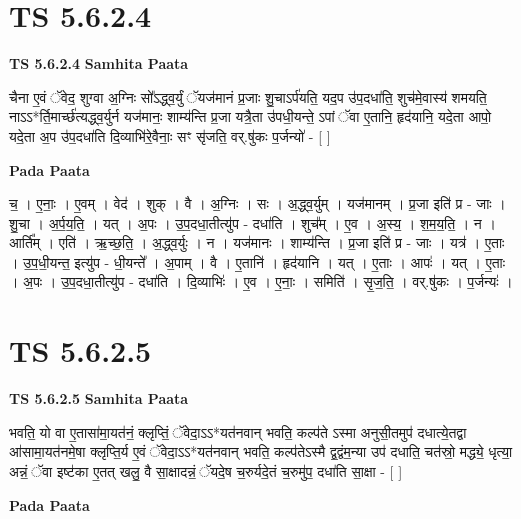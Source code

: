 \documentclass[17pt]{extarticle}
\begin{document}
\section*{ TS 5.6.2.4 }

\textbf{TS 5.6.2.4 } \newline
\textbf{Samhita Paata} \newline

चैना ए॒वं ॅवेद॒ शुग्वा अ॒ग्निः सो᳚ऽद्ध्व॒र्युं ॅयज॑मानं प्र॒जाः शु॒चाऽर्प॑यति॒ यद॒प उ॑प॒दधा॑ति॒ शुच॑मे॒वास्य॑ शमयति॒ नाऽऽ*र्ति॒मार्च्छ॑त्यद्ध्व॒र्युर्न यज॑मानः॒ शाम्य॑न्ति प्र॒जा यत्रै॒ता उ॑पधी॒यन्ते॒ ऽपां ॅवा ए॒तानि॒ हृद॑यानि॒ यदे॒ता आपो॒ यदे॒ता अ॒प उ॑प॒दधा॑ति दि॒व्याभि॑रे॒वैनाः॒ सꣳ सृ॑जति॒ वर्.षु॑कः प॒र्जन्यो॑ - [  ] \newline

\textbf{Pada Paata} \newline

च॒ । ए॒नाः॒ । ए॒वम् । वेद॑ । शुक् । वै । अ॒ग्निः । सः । अ॒द्ध्व॒र्युम् । यज॑मानम् । प्र॒जा इति॑ प्र - जाः । शु॒चा । अ॒र्प॒य॒ति॒ । यत् । अ॒पः । उ॒प॒दधा॒तीत्यु॑प - दधा॑ति । शुच᳚म् । ए॒व । अ॒स्य॒ । श॒म॒य॒ति॒ । न । आर्ति᳚म् । एति॑ । ऋ॒च्छ॒ति॒ । अ॒द्ध्व॒र्युः । न । यज॑मानः । शाम्य॑न्ति । प्र॒जा इति॑ प्र - जाः । यत्र॑ । ए॒ताः । उ॒प॒धी॒यन्त॒ इत्यु॑प - धी॒यन्ते᳚ । अ॒पाम् । वै । ए॒तानि॑ । हृद॑यानि । यत् । ए॒ताः । आपः॑ । यत् । ए॒ताः । अ॒पः । उ॒प॒दधा॒तीत्यु॑प - दधा॑ति । दि॒व्याभिः॑ । ए॒व । ए॒नाः॒ । समिति॑ । सृ॒ज॒ति॒ । वर्.षु॑कः । प॒र्जन्यः॑ ।  \newline




\section*{ TS 5.6.2.5 }

\textbf{TS 5.6.2.5 } \newline
\textbf{Samhita Paata} \newline

भवति॒ यो वा ए॒तासा॑मा॒यत॑नं॒ क्लृप्तिं॒ ॅवेदा॒ऽऽ*यत॑नवान् भवति॒ कल्प॑ते ऽस्मा अनुसी॒तमुप॑ दधात्ये॒तद्वा आ॑सामा॒यत॑नमे॒षा क्लृप्ति॒र्य ए॒वं ॅवेदा॒ऽऽ*यत॑नवान् भवति॒ कल्प॑तेऽस्मै द्व॒द्वंम॒न्या उप॑ दधाति॒ चत॑स्रो॒ मद्ध्ये॒ धृत्या॒ अन्नं॒ ॅवा इष्ट॑का ए॒तत् खलु॒ वै सा॒क्षादन्नं॒ ॅयदे॒ष च॒रुर्यदे॒तं च॒रुमु॑प॒ दधा॑ति सा॒क्षा - [  ] \newline

\textbf{Pada Paata} \newline
\end{document}
